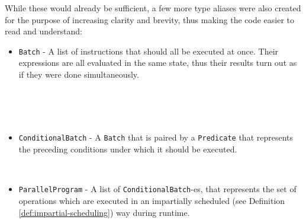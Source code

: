 While these would already be sufficient, a few more type aliases were also created for the purpose of increasing clarity and brevity, thus making the code easier to read and understand:
\begin{itemize}
    
    \item \verb|Batch| - A list of instructions that should all be executed at once. Their expressions are all evaluated in the same state, thus their results turn out as if they were done simultaneously.
    \begin{code}
        \>[2]\AgdaSpace{}%
        \AgdaSymbol{:}\AgdaSpace{}%
        \<%
        \\
        \>[2]\AgdaSpace{}%
        \AgdaSymbol{=}\AgdaSpace{}%
        \AgdaSpace{}%
        \<%
        \\
        \>[2]\AgdaSpace{}%
        \AgdaSymbol{:}\AgdaSpace{}%
        \AgdaSpace{}%
        \AgdaSpace{}%
        \AgdaSpace{}%
        \AgdaSpace{}%
        \<%
        \\
        \>[2]\AgdaSpace{}%
        \AgdaSymbol{=}\AgdaSpace{}%
        \<%
    \end{code}
    
    \item \verb|ConditionalBatch| - A \verb|Batch| that is paired by a \verb|Predicate| that represents the preceding conditions under which it should be executed.
    \begin{code}
        \>[2]\AgdaSpace{}%
        \AgdaSymbol{:}\AgdaSpace{}%
        \<%
        \\
        \>[2]\AgdaSpace{}%
        \AgdaSymbol{=}\AgdaSpace{}%
        \AgdaSymbol{(}\AgdaSpace{}%
        \AgdaSpace{}%
        \AgdaSymbol{)}\<%
    \end{code}
    
    \item \verb|ParallelProgram| - A list of \verb|ConditionalBatch|-es, that represents the set of operations which are executed in an impartially scheduled (see Definition \ref{def:impartial-scheduling}) way during runtime.
    \begin{code}
        \>[2]\AgdaSpace{}%
        \AgdaSymbol{:}\AgdaSpace{}%
        \<%
        \\
        \>[2]\AgdaSpace{}%
        \AgdaSymbol{=}\AgdaSpace{}%
        \AgdaSpace{}%
        \<%
    \end{code}
    

\end{itemize}
